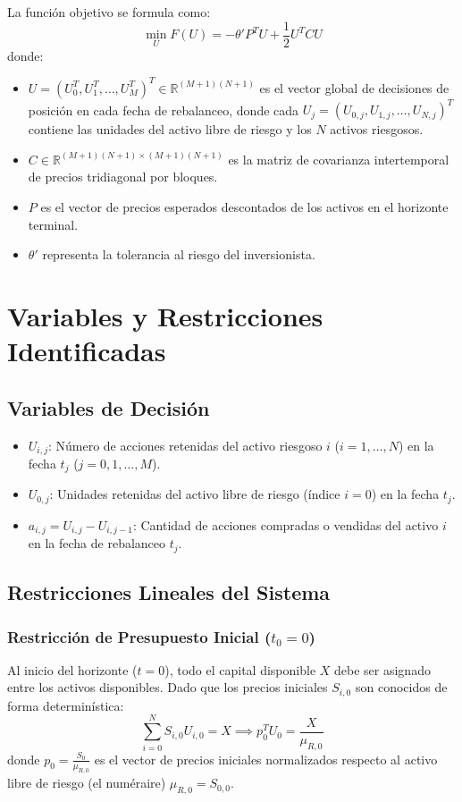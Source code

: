 \documentclass[11pt,a4paper]{article}
\begin{document}
La función objetivo se formula como:
\begin{equation}
    \min_U F(U) = -\theta' P^T U + \frac{1}{2} U^T C U
\end{equation}
donde:
\begin{itemize}
    \item $U = (U_0^T, U_1^T, \dots, U_M^T)^T \in \mathbb{R}^{(M+1)(N+1)}$ es el vector global de decisiones de posición en cada fecha de rebalanceo, donde cada $U_j = (U_{0,j}, U_{1,j}, \dots, U_{N,j})^T$ contiene las unidades del activo libre de riesgo y los $N$ activos riesgosos.
    \item $C \in \mathbb{R}^{(M+1)(N+1)\times (M+1)(N+1)}$ es la matriz de covarianza intertemporal de precios tridiagonal por bloques.
    \item $P$ es el vector de precios esperados descontados de los activos en el horizonte terminal.
    \item $\theta'$ representa la tolerancia al riesgo del inversionista.
\end{itemize}

\section{Variables y Restricciones Identificadas}

\subsection{Variables de Decisión}
\begin{itemize}
    \item $U_{i,j}$: Número de acciones retenidas del activo riesgoso $i$ ($i = 1, \dots, N$) en la fecha $t_j$ ($j = 0, 1, \dots, M$).
    \item $U_{0,j}$: Unidades retenidas del activo libre de riesgo (índice $i = 0$) en la fecha $t_j$.
    \item $a_{i,j} = U_{i,j} - U_{i,j-1}$: Cantidad de acciones compradas o vendidas del activo $i$ en la fecha de rebalanceo $t_j$.
\end{itemize}

\subsection{Restricciones Lineales del Sistema}

\subsubsection{Restricción de Presupuesto Inicial \texorpdfstring{($t_0 = 0$)}{(t0 = 0)}}
Al inicio del horizonte ($t = 0$), todo el capital disponible $X$ debe ser asignado entre los activos disponibles. Dado que los precios iniciales $S_{i,0}$ son conocidos de forma determinística:
\begin{equation}
    \sum_{i=0}^N S_{i,0} U_{i,0} = X \implies p_0^T U_0 = \frac{X}{\mu_{R,0}}
\end{equation}
donde $p_0 = \frac{S_0}{\mu_{R,0}}$ es el vector de precios iniciales normalizados respecto al activo libre de riesgo (el numéraire) $\mu_{R,0} = S_{0,0}$.
\end{document}
